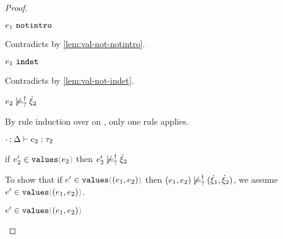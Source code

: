 \begin{proof}
\begin{byCases}
\begin{byCases}
\begin{byCases}
\begin{byCases}
\begin{byCases}
\begin{pfsteps*}
            \end{pfsteps*} 
            \item[\text{(\ref{rule:IVIndet})}]
            \begin{pfsteps*}
            \item $e_1 ~\mathtt{notintro}$ 
            \end{pfsteps*} 
            Contradicts  by \autoref{lem:val-not-notintro}.
            \item[\text{(\ref{rule:IVInl}), (\ref{rule:IVInr}), (\ref{rule:IVPair})}]
            \begin{pfsteps*}
            \item $e_1 ~\mathtt{indet}$ 
            \end{pfsteps*} 
            Contradicts  by \autoref{lem:val-not-indet}.
          \end{byCases}
        \end{byCases}
        \item[\cnotsatisfyormay{e_2}{\hxi_2}]
        \begin{pfsteps*}
        \item $e_2 \not\models_{?}^{\dag} \dot{\xi}_2$  
        \end{pfsteps*}
        By rule induction over  on , only one rule applies.
        \begin{byCases}
          \item[\text{(\ref{rule:TPair})}]
          \begin{pfsteps*}
          \item $\cdot \mathbin{;} \Delta \vdash e_2 : \tau_2$  
          \item if $\inValues{e_2'}{e_2}$ then $e_2' \not\models_{?}^{\dag} \dot{\xi}_2$  
          \end{pfsteps*} 
          To show that if $\inValues{e'}{\hpair{e_1}{e_2}}$ then $(e_1 , e_2) \not\models_{?}^{\dag} (\dot{\xi}_1 , \dot{\xi}_2)$, we assume $\inValues{e'}{\hpair{e_1}{e_2}}$.
          \begin{pfsteps*}
          \item $\inValues{e'}{\hpair{e_1}{e_2}}$  

\end{pfsteps*}
\end{byCases}
\end{byCases}
\end{byCases}
\end{byCases}
\end{proof}
